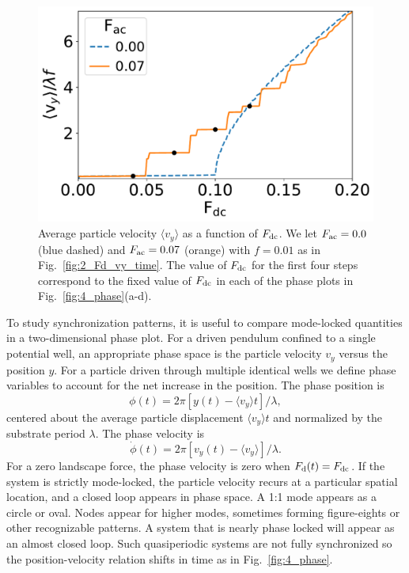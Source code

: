 \documentclass[preprint,showpacs,preprintnumbers,amsmath,amssymb,aps,prb]{revtex4-1}
\theoremstyle{remark}
\begin{document}
\begin{figure}[h]
\centering
\includegraphics[width=\columnwidth]{fig3_sweep_vyFDC.pdf}
\caption{Average particle velocity  $\langle v_{y} \rangle$
  as a function of $F_{\rm dc}$.
  We let
  $F_{\rm ac}=0.0$ (blue dashed) and 
  $F_{\rm ac}=0.07$ (orange) with $f = 0.01$ 
  as in Fig.~\ref{fig:2_Fd_vy_time}.
  The value of $F_{\rm dc}$ for the first four steps
  correspond to the fixed value of $F_{\rm dc}$
  in each of the phase plots
  in Fig.~\ref{fig:4_phase}(a-d).
}
\label{fig:3_sweep_vyFDC}
\end{figure}

  To study synchronization patterns, 
  it is useful to compare
  mode-locked quantities 
  in a two-dimensional phase plot. 
  For a driven pendulum confined to a single potential well,
  an appropriate
  phase space is the particle velocity $v_y$ versus the position $y$.  
  For a particle driven 
  through multiple identical wells 
  we define phase variables 
  to account for the net increase in the position.
  The phase position is
  \begin{equation}
    \phi(t) = 2\pi [y(t)-\langle v_y \rangle t]/\lambda,
  \end{equation}
  centered about the average particle displacement $\langle v_y \rangle t$
  and normalized by the substrate period $\lambda$.\cite{Juniper2015}
  The phase velocity is
  \begin{equation}
    \dot{\phi}(t) =2\pi [v_y(t)-\langle v_y \rangle] /\lambda.  
  \end{equation}
For a zero landscape force, 
  the phase velocity  is zero when $F_{\rm d}(t) = F_{\rm dc}$.
If the system
  is strictly mode-locked,
  the particle velocity
  recurs at a particular spatial location, and 
a closed loop appears in  
  phase space. 
  A 1:1 mode appears as a circle or oval. 
  Nodes appear 
  for higher modes,
  sometimes forming figure-eights
  or other recognizable patterns.
  A system that is nearly phase locked
  will appear as an almost closed loop.
  Such quasiperiodic systems are
  not fully synchronized
  so the position-velocity relation
  shifts in time as in Fig.~\ref{fig:4_phase}.
  
\end{document}
